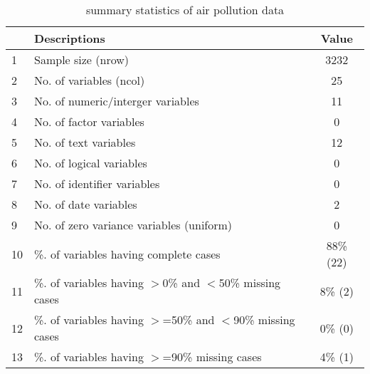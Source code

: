 \begin{table}[h]
\centering
\caption{summary statistics of air pollution data} 
\begin{tabular}{llc}
  \hline
 & Descriptions & Value \\ 
  \hline
1 & Sample size (nrow) & 3232 \\ 
   \hline
2 & No. of variables (ncol) & 25 \\ 
   \hline
3 & No. of numeric/interger variables & 11 \\ 
   \hline
4 & No. of factor variables & 0 \\ 
   \hline
5 & No. of text variables & 12 \\ 
   \hline
6 & No. of logical variables & 0 \\ 
   \hline
7 & No. of identifier variables & 0 \\ 
   \hline
8 & No. of date variables & 2 \\ 
   \hline
9 & No. of zero variance variables (uniform) & 0 \\ 
   \hline
10 & \%. of variables having complete cases & 88\% (22) \\ 
   \hline
11 & \%. of variables having $>$0\% and $<$50\% missing cases & 8\% (2) \\ 
   \hline
12 & \%. of variables having $>$=50\% and $<$90\% missing cases & 0\% (0) \\ 
   \hline
13 & \%. of variables having $>$=90\% missing cases & 4\% (1) \\ 
   \hline
\end{tabular}
\end{table}
